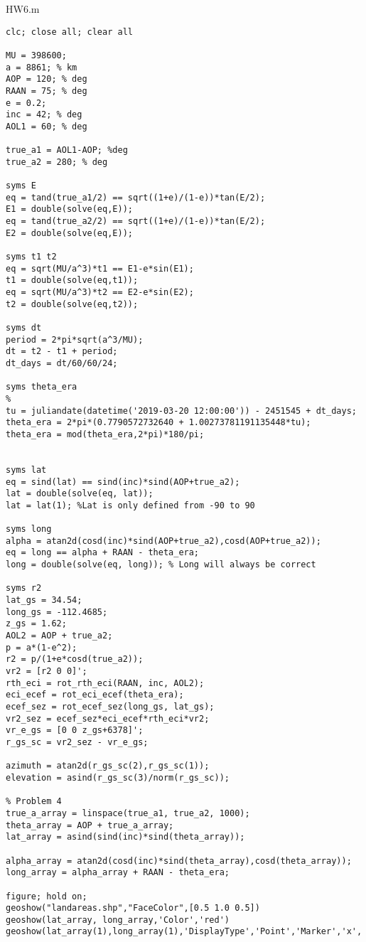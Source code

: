 HW6.m
\begin{lstlisting}[frame=lines,style=Matlab-editor,basicstyle = \mlttfamily]
clc; close all; clear all

MU = 398600;
a = 8861; % km
AOP = 120; % deg
RAAN = 75; % deg
e = 0.2;
inc = 42; % deg
AOL1 = 60; % deg

true_a1 = AOL1-AOP; %deg
true_a2 = 280; % deg

syms E
eq = tand(true_a1/2) == sqrt((1+e)/(1-e))*tan(E/2);
E1 = double(solve(eq,E));
eq = tand(true_a2/2) == sqrt((1+e)/(1-e))*tan(E/2);
E2 = double(solve(eq,E));

syms t1 t2
eq = sqrt(MU/a^3)*t1 == E1-e*sin(E1);
t1 = double(solve(eq,t1));
eq = sqrt(MU/a^3)*t2 == E2-e*sin(E2);
t2 = double(solve(eq,t2));

syms dt
period = 2*pi*sqrt(a^3/MU);
dt = t2 - t1 + period;
dt_days = dt/60/60/24;

syms theta_era
%
tu = juliandate(datetime('2019-03-20 12:00:00')) - 2451545 + dt_days;
theta_era = 2*pi*(0.7790572732640 + 1.00273781191135448*tu);
theta_era = mod(theta_era,2*pi)*180/pi;


syms lat
eq = sind(lat) == sind(inc)*sind(AOP+true_a2);
lat = double(solve(eq, lat));
lat = lat(1); %Lat is only defined from -90 to 90

syms long
alpha = atan2d(cosd(inc)*sind(AOP+true_a2),cosd(AOP+true_a2));
eq = long == alpha + RAAN - theta_era;
long = double(solve(eq, long)); % Long will always be correct

syms r2
lat_gs = 34.54;
long_gs = -112.4685;
z_gs = 1.62;
AOL2 = AOP + true_a2;
p = a*(1-e^2);
r2 = p/(1+e*cosd(true_a2));
vr2 = [r2 0 0]';
rth_eci = rot_rth_eci(RAAN, inc, AOL2);
eci_ecef = rot_eci_ecef(theta_era);
ecef_sez = rot_ecef_sez(long_gs, lat_gs);
vr2_sez = ecef_sez*eci_ecef*rth_eci*vr2;
vr_e_gs = [0 0 z_gs+6378]';
r_gs_sc = vr2_sez - vr_e_gs;

azimuth = atan2d(r_gs_sc(2),r_gs_sc(1));
elevation = asind(r_gs_sc(3)/norm(r_gs_sc));

% Problem 4
true_a_array = linspace(true_a1, true_a2, 1000);
theta_array = AOP + true_a_array;
lat_array = asind(sind(inc)*sind(theta_array));

alpha_array = atan2d(cosd(inc)*sind(theta_array),cosd(theta_array));
long_array = alpha_array + RAAN - theta_era;

figure; hold on;
geoshow("landareas.shp","FaceColor",[0.5 1.0 0.5])
geoshow(lat_array, long_array,'Color','red')
geoshow(lat_array(1),long_array(1),'DisplayType','Point','Marker','x','Markersize',20)


\end{lstlisting}
